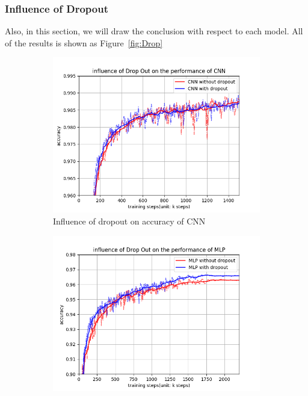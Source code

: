 \documentclass[12pt,letterpaper]{article}
\begin{document}
\subsubsection{Influence of Dropout}

Also, in this section, we will draw the conclusion with respect to each model. All of the results is shown as Figure~\ref{fig:Drop}
\begin{figure}[h]
    \begin{subfigure}{0.32\textwidth}
    \includegraphics[width=\linewidth]{CNN_dropout_acc.png}
    \caption{\small Influence of dropout on accuracy of CNN} \label{fig:a}
    \end{subfigure}\hspace*{\fill}
    \begin{subfigure}{0.32\textwidth}
    \includegraphics[width=\linewidth]{MLP_dropout_acc.png}

\end{subfigure}
\end{figure}
\end{document}
